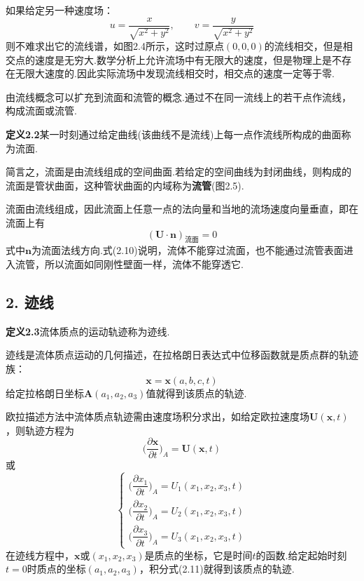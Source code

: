 如果给定另一种速度场：
\[
u=\frac{x}{\sqrt{x^{2}+y^{2}}},\qquad v=\frac{y}{\sqrt{x^{2}+y^{2}}}
\]
则不难求出它的流线谱，如图2.4所示，这时过原点$(0,0,0)$的流线相交，但是相交点的速度是无穷大.数学分析上允许流场中有无限大的速度，但是物理上是不存在无限大速度的.因此实际流场中发现流线相交时，相交点的速度一定等于零.

由流线概念可以扩充到流面和流管的概念.通过不在同一流线上的若干点作流线，构成流面或流管.

\noindent\textbf{定义2.2}\quad 某一时刻通过给定曲线(该曲线不是流线)上每一点作流线所构成的曲面称为流面.

简言之，流面是由流线组成的空间曲面.若给定的空间曲线为封闭曲线，则构成的流面是管状曲面，这种管状曲面的内域称为\textbf{流管}(图2.5).

流面由流线组成，因此流面上任意一点的法向量和当地的流场速度向量垂直，即在流面上有
\begin{equation*}
(\boldsymbol{U}\cdot\boldsymbol{n})_{\text{流面}}=0
\tag{2.10}
\end{equation*}
式中$\boldsymbol{n}$为流面法线方向.式(2.10)说明，流体不能穿过流面，也不能通过流管表面进入流管，所以流面如同刚性壁面一样，流体不能穿透它.

\subsection*{2. 迹线}

\noindent\textbf{定义2.3}\quad 流体质点的运动轨迹称为迹线.

迹线是流体质点运动的几何描述，在拉格朗日表达式中位移函数就是质点群的轨迹族：
\[
\boldsymbol{x}=\boldsymbol{x}(a,b,c,t)
\]
给定拉格朗日坐标$\boldsymbol{A}(a_1,a_2,a_3)$值就得到该质点的轨迹.

欧拉描述方法中流体质点轨迹需由速度场积分求出，如给定欧拉速度场$\boldsymbol{U}(\boldsymbol{x},t)$，则轨迹方程为
\begin{equation*}
\Big(\frac{\partial\boldsymbol{x}}{\partial t}\Big)_{\!A}=\boldsymbol{U}(\boldsymbol{x},t)
\tag{2.11a}
\end{equation*}
或
\begin{equation*}
\begin{cases}
\Big(\dfrac{\partial x_1}{\partial t}\Big)_{\!A}=U_1(x_1,x_2,x_3,t)\\[6pt]
\Big(\dfrac{\partial x_2}{\partial t}\Big)_{\!A}=U_2(x_1,x_2,x_3,t)\\[6pt]
\Big(\dfrac{\partial x_3}{\partial t}\Big)_{\!A}=U_3(x_1,x_2,x_3,t)
\end{cases}
\tag{2.11b}
\end{equation*}
在迹线方程中，$\boldsymbol{x}$或$(x_1,x_2,x_3)$是质点的坐标，它是时间$t$的函数.给定起始时刻$t=0$时质点的坐标$(a_1,a_2,a_3)$，积分式(2.11)就得到该质点的轨迹.


